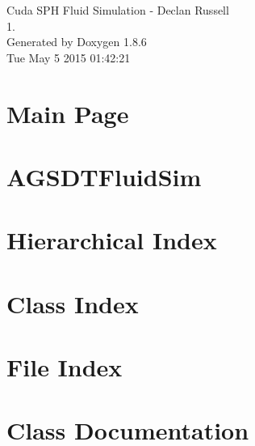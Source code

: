 \documentclass[twoside]{book}
\newcommand{\clearemptydoublepage}{%
  \newpage{\pagestyle{empty}\cleardoublepage}%
}
\begin{document}
\hypersetup{pageanchor=false}
\begin{titlepage}
\vspace*{7cm}
\begin{center}%
{\Large Cuda S\-P\-H Fluid Simulation -\/ Declan Russell \\[1ex]\large 1. }\\
\vspace*{1cm}
{\large Generated by Doxygen 1.8.6}\\
\vspace*{0.5cm}
{\small Tue May 5 2015 01:42:21}\\
\end{center}
\end{titlepage}
\clearemptydoublepage
\tableofcontents
\clearemptydoublepage
{}
\hypersetup{pageanchor=true}

\chapter{Main Page}
\label{index}\hypertarget{index}{}
\chapter{A\-G\-S\-D\-T\-Fluid\-Sim}
\label{md__r_e_a_d_m_e}
\hypertarget{md__r_e_a_d_m_e}{}

\chapter{Hierarchical Index}

\chapter{Class Index}

\chapter{File Index}

\chapter{Class Documentation}
































\end{document}
